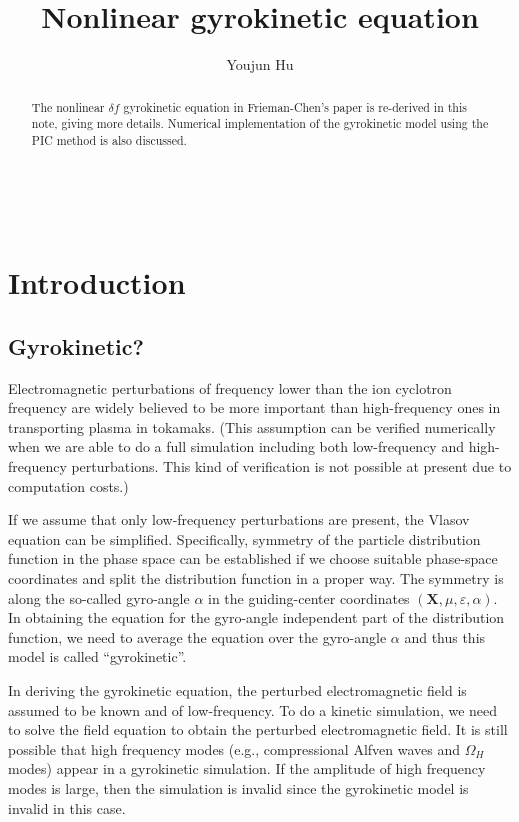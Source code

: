 \documentclass{llncs}
\begin{document}
\

\title{Nonlinear gyrokinetic equation}

\author{Youjun Hu}


\maketitle

\begin{abstract}
  The nonlinear $\delta f$ gyrokinetic equation in Frieman-Chen's
  paper{\cite{frieman1982}} is re-derived in this note, giving more details.
  Numerical implementation of the gyrokinetic model using the PIC method is
  also discussed.
\end{abstract}

\section{Introduction}

\subsection{Gyrokinetic?}

Electromagnetic perturbations of frequency lower than the ion cyclotron
frequency are widely believed to be more important than high-frequency ones in
transporting plasma in tokamaks. (This assumption can be verified numerically
when we are able to do a full simulation including both low-frequency and
high-frequency perturbations. This kind of verification is not possible at
present due to computation costs.)

If we assume that only low-frequency perturbations are present, the Vlasov
equation can be simplified. Specifically, symmetry of the particle
distribution function in the phase space can be established if we choose
suitable phase-space coordinates and split the distribution function in a
proper way. The symmetry is along the so-called gyro-angle $\alpha$ in the
guiding-center coordinates $(\mathbf{X}, \mu, \varepsilon, \alpha)$. In
obtaining the equation for the gyro-angle independent part of the distribution
function, we need to average the equation over the gyro-angle $\alpha$ and
thus this model is called ``gyrokinetic''.

In deriving the gyrokinetic equation, the perturbed electromagnetic field is
assumed to be known and of low-frequency. To do a kinetic simulation, we need
to solve the field equation to obtain the perturbed electromagnetic field. It
is still possible that high frequency modes (e.g., compressional Alfven waves
and $\Omega_H$ modes) appear in a gyrokinetic simulation. If the amplitude of
high frequency modes is large, then the simulation is invalid since the
gyrokinetic model is invalid in this case.
\end{document}
